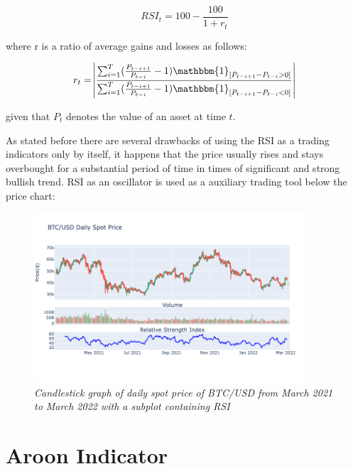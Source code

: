 \begin{equation}
RSI_t = 100- \frac{100}{1+r_t} 
\end{equation}
 
 where r is a ratio of average gains and losses as follows:
 
\begin{equation}
 r_t = \abs{\frac{\sum_{i=1}^{T}(\frac{P_{t-i+1}}{P_{t-i}}-1)\mathbbm{1}_{[P_{t-i+1} - P_{t-i} > 0]}}{\sum_{i=1}^{T}(\frac{P_{t-i+1}}{P_{t-i}}-1) \mathbbm{1}_{[P_{t-i+1} - P_{t-i} < 0]}}}
\end{equation}

given that $P_t$ denotes the value of an asset at time $t$.

As stated before there are several drawbacks of using the RSI as a trading indicators only by itself, it happens that the price usually rises and stays overbought for a substantial period of time in times of significant and strong bullish trend. RSI as an oscillator is used as a auxiliary trading tool below the price chart:

\begin{figure}[ht]

\begin{center}
	\includegraphics[width=0.9\textwidth]{RSI.png}
\end{center}

\caption{\textit{ Candlestick graph of daily spot price of BTC/USD from March 2021 to March 2022 with a subplot containing  RSI}}

\end{figure}

\section{Aroon Indicator}

